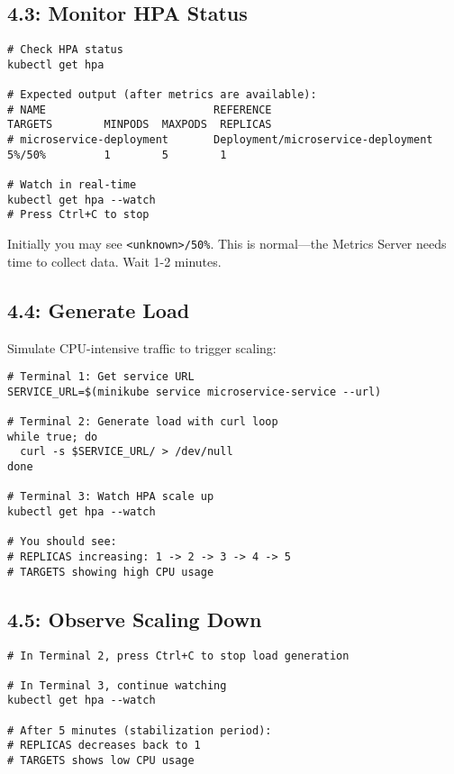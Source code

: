 \documentclass[12pt,a4paper]{article}
\begin{document}
\subsection{4.3: Monitor HPA Status}

\begin{lstlisting}[caption=Monitor HPA]
# Check HPA status
kubectl get hpa

# Expected output (after metrics are available):
# NAME                          REFERENCE                              TARGETS        MINPODS  MAXPODS  REPLICAS
# microservice-deployment       Deployment/microservice-deployment     5%/50%         1        5        1

# Watch in real-time
kubectl get hpa --watch
# Press Ctrl+C to stop
\end{lstlisting}

\begin{tipbox}
Initially you may see \texttt{<unknown>/50\%}. This is normal—the Metrics Server needs time to collect data. Wait 1-2 minutes.
\end{tipbox}

\subsection{4.4: Generate Load}

Simulate CPU-intensive traffic to trigger scaling:

\begin{lstlisting}[caption=Generate load with curl loop]
# Terminal 1: Get service URL
SERVICE_URL=$(minikube service microservice-service --url)

# Terminal 2: Generate load with curl loop
while true; do
  curl -s $SERVICE_URL/ > /dev/null
done

# Terminal 3: Watch HPA scale up
kubectl get hpa --watch

# You should see:
# REPLICAS increasing: 1 -> 2 -> 3 -> 4 -> 5
# TARGETS showing high CPU usage
\end{lstlisting}

\subsection{4.5: Observe Scaling Down}

\begin{lstlisting}[caption=Stop load and watch scale-down]
# In Terminal 2, press Ctrl+C to stop load generation

# In Terminal 3, continue watching
kubectl get hpa --watch

# After 5 minutes (stabilization period):
# REPLICAS decreases back to 1
# TARGETS shows low CPU usage
\end{lstlisting}
\end{document}
